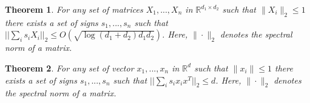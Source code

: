 \documentclass{article} %
\newtheorem{theorem}{Theorem}[section]
\newcommand{\R}{\mathbb{R}}
\begin{document}
\begin{theorem}
For any set of matrices $X_1,...,X_n$ in $\R^{d_1 \times d_2}$ such that $\|X_i\|_{2} \le 1$ there exists a set of signs $s_1,...,s_n$ such that $||\sum_i s_i X_i||_{2} \le O(\sqrt{\log(d_1 + d_2) d_1d_2})$.
Here, $\|\cdot\|_2$ denotes the spectral norm of a matrix. 
\end{theorem}

\begin{theorem}
For any set of vector $x_1,...,x_n$ in $\R^d$ such that $\|x_i\| \le 1$ there exists a set of 
signs $s_1,...,s_n$ such that $||\sum_i s_i x_i x^T||_2 \le d$.
Here, $\|\cdot\|_2$ denotes the spectral norm of a matrix. 
\end{theorem}
\end{document}
